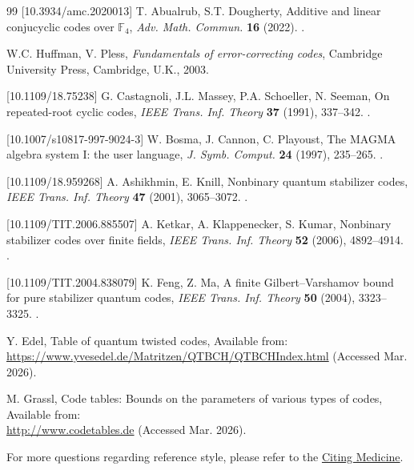 \documentclass{aims}
\numberwithin{equation}{section}
\theoremstyle{definition}
\begin{document}
\begin{thebibliography}{99}
	[10.3934/amc.2020013]
	T. Abualrub, S.T. Dougherty,
	\newblock Additive and linear conjucyclic codes over $\mathbb{F}_4$,
	\newblock \textit{Adv. Math. Commun.} \textbf{16} (2022).
	\newblock {}.
	
	W.C. Huffman, V. Pless,
	\newblock \textit{Fundamentals of error-correcting codes},
	\newblock Cambridge University Press, Cambridge, U.K., 2003.
	
	[10.1109/18.75238]
	G. Castagnoli, J.L. Massey, P.A. Schoeller, N. Seeman,
	\newblock On repeated-root cyclic codes,
	\newblock \textit{IEEE Trans. Inf. Theory} \textbf{37} (1991), 337–342.
	\newblock {}.
	
	[10.1007/s10817-997-9024-3]
	W. Bosma, J. Cannon, C. Playoust,
	\newblock The MAGMA algebra system I: the user language,
	\newblock \textit{J. Symb. Comput.} \textbf{24} (1997), 235–265.
	\newblock {}.
	
	[10.1109/18.959268]
	A. Ashikhmin, E. Knill,
	\newblock Nonbinary quantum stabilizer codes,
	\newblock \textit{IEEE Trans. Inf. Theory} \textbf{47} (2001), 3065–3072.
	\newblock {}.
	
	[10.1109/TIT.2006.885507]
	A. Ketkar, A. Klappenecker, S. Kumar,
	\newblock Nonbinary stabilizer codes over finite fields,
	\newblock \textit{IEEE Trans. Inf. Theory} \textbf{52} (2006), 4892–4914.
	\newblock {}.
	
	[10.1109/TIT.2004.838079]
	K. Feng, Z. Ma,
	\newblock A finite Gilbert–Varshamov bound for pure stabilizer quantum codes,
	\newblock \textit{IEEE Trans. Inf. Theory} \textbf{50} (2004), 3323–3325.
	\newblock {}.
	
	Y. Edel,
	\newblock Table of quantum twisted codes,
	\newblock Available from: \\ \url{https://www.yvesedel.de/Matritzen/QTBCH/QTBCHIndex.html} (Accessed Mar. 2026).
	
	M. Grassl,
	\newblock Code tables: Bounds on the parameters of various types of codes,
	\newblock Available from: \\ \url{http://www.codetables.de} (Accessed Mar. 2026).
\end{thebibliography}


For more questions regarding reference style, please refer to the \href{http://www.ncbi.nlm.nih.gov/books/NBK7256/}{Citing Medicine}.
\end{document}

